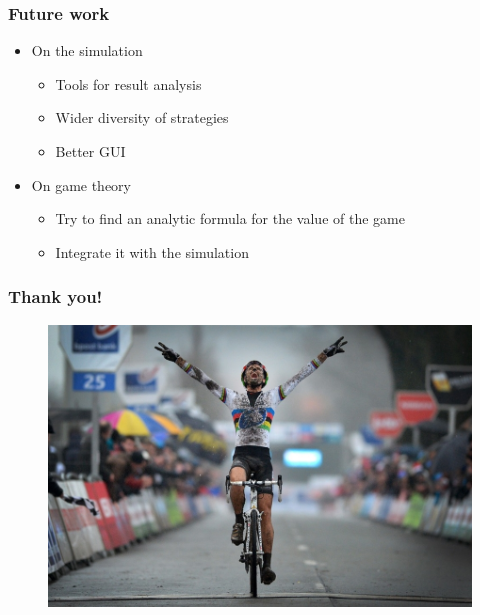 \documentclass{beamer}
\begin{document}
\begin{frame}
\frametitle{Future work}
  \begin{itemize}
  \item{On the simulation}
    \begin{itemize}
    \item Tools for result analysis
    \item Wider diversity of strategies
    \item Better GUI
    \end{itemize}

    \pause

    \vspace{0.3cm}

  \item{On game theory}
    \begin{itemize}
    \item Try to find an analytic formula for the value of the game
    \item Integrate it with the simulation
    \end{itemize}
  \end{itemize}
\end{frame}


\begin{frame}
\frametitle{Thank you!}
\centering
\begin{figure}[ht!]
  \includegraphics[scale=0.37]{final.jpg}
\end{figure}
\end{frame}

\end{document}

